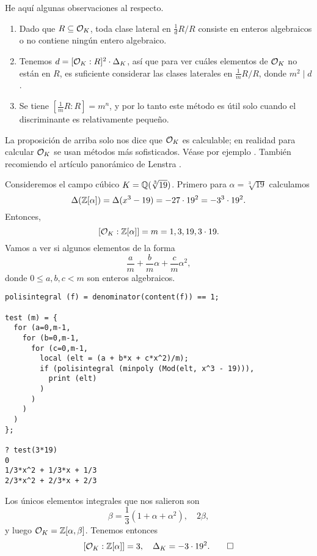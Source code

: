 \begin{comentario}
  He aquí algunas observaciones al respecto.

  \begin{enumerate}
  \item Dado que $R \subseteq \mathcal{O}_K$, toda clase lateral en $\frac{1}{d}R/R$
    consiste en enteros algebraicos o no contiene ningún entero algebraico.

  \item Tenemos $d = [\mathcal{O}_K : R]^2\cdot \Delta_K$, así que para ver cuáles
    elementos de $\mathcal{O}_K$ no están en $R$, es suficiente considerar las clases
    laterales en $\frac{1}{m}R/R$, donde $m^2 \mid d$.

  \item Se tiene $[\frac{1}{m}R : R] = m^n$, y por lo tanto este método es útil
    solo cuando el discriminante es relativamente pequeño.
  \end{enumerate}

  La proposición de arriba solo nos dice que $\mathcal{O}_K$ es calculable; en realidad
  para calcular $\mathcal{O}_K$ se usan métodos más sofisticados. Véase por ejemplo
  \cite[\S 6.1]{Cohen-GTM138}. También recomiendo el artículo panorámico
  de Lenstra \cite{Lenstra-1992}.
\end{comentario}

\begin{ejemplo}
  \label{ejemplo:raiz-cubica-de-19}
  Consideremos el campo cúbico $K = \mathbb{Q} (\sqrt[3]{19})$. Primero para
  $\alpha = \sqrt[3]{19}$ calculamos
  \[ \Delta (\mathbb{Z} [\alpha]) = \Delta (x^3 - 19)
     = -27\cdot 19^2 = -3^3\cdot 19^2. \]
  Entonces,
  $$[\mathcal{O}_K : \mathbb{Z} [\alpha]] = m = 1, 3, 19, 3\cdot 19.$$
  Vamos a ver si algunos elementos de la forma
  $$\frac{a}{m} + \frac{b}{m}\alpha + \frac{c}{m}\alpha^2,$$
  donde $0 \le a,b,c < m$ son enteros algebraicos.

\begin{shaded}
\begin{verbatim}
polisintegral (f) = denominator(content(f)) == 1;

test (m) = {
  for (a=0,m-1,
    for (b=0,m-1,
      for (c=0,m-1,
        local (elt = (a + b*x + c*x^2)/m);
        if (polisintegral (minpoly (Mod(elt, x^3 - 19))),
          print (elt)
        )
      )
    )
  )
};

? test(3*19)
0
1/3*x^2 + 1/3*x + 1/3
2/3*x^2 + 2/3*x + 2/3
\end{verbatim}
\end{shaded}
  Los únicos elementos integrales que nos salieron son
  $$\beta = \frac{1}{3} (1 + \alpha + \alpha^2), \quad 2\beta,$$
  y luego $\mathcal{O}_K = \mathbb{Z} [\alpha,\beta]$. Tenemos entonces
  \[ [\mathcal{O}_K : \mathbb{Z} [\alpha]] = 3, \quad \Delta_K = -3\cdot 19^2. \qedhere \]
\end{ejemplo}


